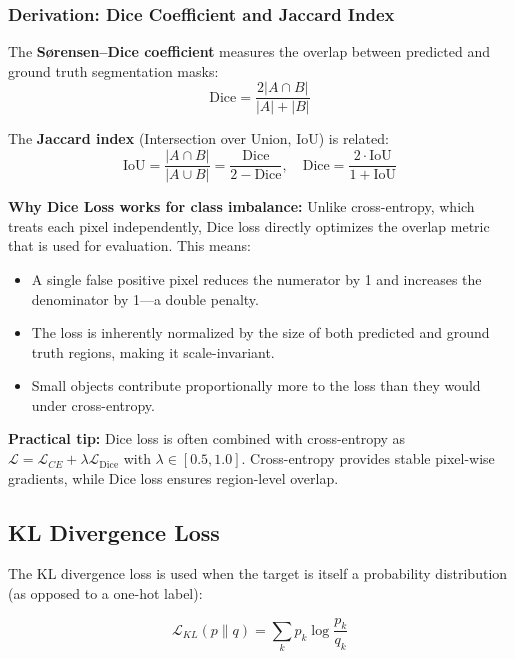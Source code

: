 \subsubsection{Derivation: Dice Coefficient and Jaccard Index}

The \textbf{S{\o}rensen--Dice coefficient} measures the overlap between predicted and ground truth segmentation masks:
\begin{equation}
\text{Dice} = \frac{2|A \cap B|}{|A| + |B|}
\end{equation}

The \textbf{Jaccard index} (Intersection over Union, IoU) is related:
\begin{equation}
\text{IoU} = \frac{|A \cap B|}{|A \cup B|} = \frac{\text{Dice}}{2 - \text{Dice}}, \quad \text{Dice} = \frac{2 \cdot \text{IoU}}{1 + \text{IoU}}
\end{equation}

\textbf{Why Dice Loss works for class imbalance:} Unlike cross-entropy, which treats each pixel independently, Dice loss directly optimizes the overlap metric that is used for evaluation. This means:
\begin{itemize}
    \item A single false positive pixel reduces the numerator by 1 and increases the denominator by 1---a double penalty.
    \item The loss is inherently normalized by the size of both predicted and ground truth regions, making it scale-invariant.
    \item Small objects contribute proportionally more to the loss than they would under cross-entropy.
\end{itemize}

\textbf{Practical tip:} Dice loss is often combined with cross-entropy as $\mathcal{L} = \mathcal{L}_{CE} + \lambda \mathcal{L}_{\text{Dice}}$ with $\lambda \in [0.5, 1.0]$. Cross-entropy provides stable pixel-wise gradients, while Dice loss ensures region-level overlap.

\subsection{KL Divergence Loss}

The KL divergence loss is used when the target is itself a probability distribution (as opposed to a one-hot label):

\begin{equation}
\mathcal{L}_{KL}(p \| q) = \sum_{k} p_k \log \frac{p_k}{q_k}
\end{equation}

